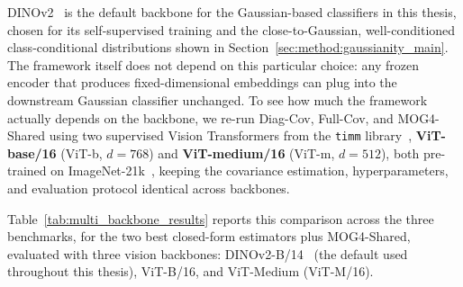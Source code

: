 DINOv2~\cite{oquab2024dinov} is the default backbone for the Gaussian-based classifiers in this thesis, chosen for its self-supervised training and the close-to-Gaussian, well-conditioned class-conditional distributions shown in Section~\ref{sec:method:gaussianity_main}. The framework itself does not depend on this particular choice: any frozen encoder that produces fixed-dimensional embeddings can plug into the downstream Gaussian classifier unchanged. To see how much the framework actually depends on the backbone, we re-run Diag-Cov, Full-Cov, and MOG4-Shared using two supervised Vision Transformers from the \texttt{timm} library~\cite{rw2019timm}, \textbf{ViT-base/16} (ViT-b, $d=768$) and \textbf{ViT-medium/16} (ViT-m, $d=512$), both pre-trained on ImageNet-21k~\cite{imagenet21k}, keeping the covariance estimation, hyperparameters, and evaluation protocol identical across backbones.

Table~\ref{tab:multi_backbone_results} reports this comparison across the three benchmarks, for the two best closed-form estimators plus MOG4-Shared, evaluated with three vision backbones: DINOv2-B/14~\cite{oquab2024dinov} (the default used throughout this thesis), ViT-B/16, and ViT-Medium (ViT-M/16).

